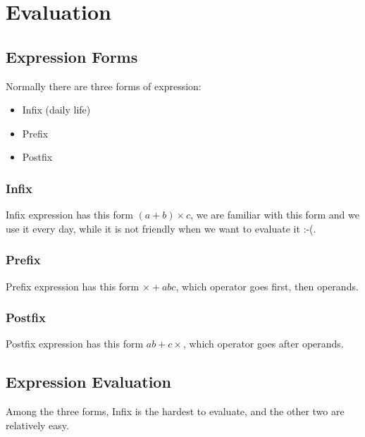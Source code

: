 \documentclass[letterpaper,10pt,english]{sphinxmanual}
\begin{document}
\section{Evaluation}
\label{topics/evaluation:evaluation}\label{topics/evaluation::doc}

\subsection{Expression Forms}
\label{topics/evaluation:expression-forms}
Normally there are three forms of expression:
\begin{itemize}
\item {} 
Infix (daily life)

\item {} 
Prefix

\item {} 
Postfix

\end{itemize}


\subsubsection{Infix}
\label{topics/evaluation:infix}
Infix expression has this form \((a + b) \times c\), we are familiar with
this form and we use it every day, while it is not friendly when we want to
evaluate it :-(.


\subsubsection{Prefix}
\label{topics/evaluation:prefix}
Prefix expression has this form \(\times + a b c\), which operator goes
first, then operands.


\subsubsection{Postfix}
\label{topics/evaluation:postfix}
Postfix expression has this form \(a b + c \times\), which operator goes
after operands.


\subsection{Expression Evaluation}
\label{topics/evaluation:expression-evaluation}
Among the three forms, Infix is the hardest to evaluate, and the other two
are relatively easy.
\end{document}
